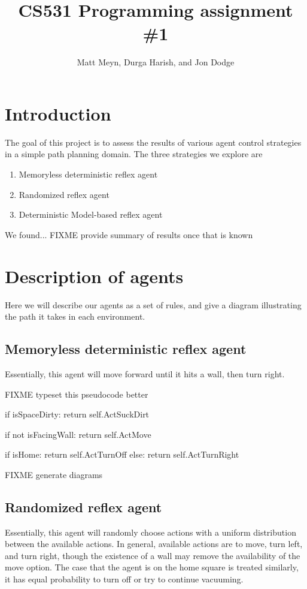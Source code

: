 \documentclass{article}
\title{CS531 Programming assignment \#1}
\author{Matt Meyn, Durga Harish, and Jon Dodge}
\begin{document}
\maketitle

\section{Introduction}
The goal of this project is to assess the results of various agent control strategies in a simple path planning domain.
The three strategies we explore are
\begin{enumerate}
\item Memoryless deterministic reflex agent
\item Randomized reflex agent
\item Deterministic Model-based reflex agent
\end{enumerate}

We found... FIXME provide summary of results once that is known

\section{Description of agents}
Here we will describe our agents as a set of rules, and give a diagram illustrating the path it takes in each environment.

\subsection{Memoryless deterministic reflex agent}
Essentially, this agent will move forward until it hits a wall, then turn right.

FIXME typeset this pseudocode better

		if isSpaceDirty:
			return self.ActSuckDirt
		
		if not isFacingWall:
			return self.ActMove
			
		if isHome:
			return self.ActTurnOff
		else:
			return self.ActTurnRight

FIXME generate diagrams

\subsection{Randomized reflex agent}
Essentially, this agent will randomly choose actions with a uniform distribution between the available actions. 
In general, available actions are to move, turn left, and turn right, though the existence of a wall may remove the availability of the move option.
The case that the agent is on the home square is treated similarly, it has equal probability to turn off or try to continue vacuuming.
\end{document}

